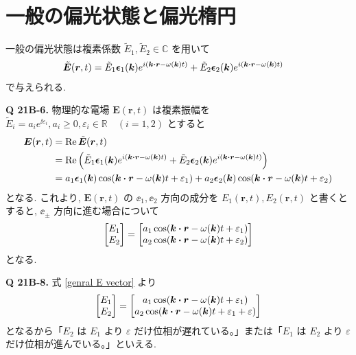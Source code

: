 \documentclass[uplatex,dvipdfmx,a4paper,11pt]{jlreq}
\newcommand{\CC}{\mathbb{C}}
\newcommand{\RR}{\mathbb{R}}
\newcommand{\EE}{\bm{E}}
\newcommand{\rr}{\bm{r}}
\newcommand{\kk}{\bm{k}}
\theoremstyle{definition}
\begin{document}
\section{一般の偏光状態と偏光楕円}
一般の偏光状態は複素係数 $\tilde{E}_1, \tilde{E}_2\in\CC$ を用いて
\begin{align}
  \tilde{\EE}(\rr, t) & = \tilde{E}_1\ee_1(\kk)e^{\ii(\kk\vdot\rr - \omega(\kk)t)} + \tilde{E}_2\ee_2(\kk)e^{\ii(\kk\vdot\rr - \omega(\kk)t)} \label{tilde E def}
\end{align}
で与えられる.

\textbf{Q 21B-6.} 物理的な電場 $\EE(\rr, t)$ は複素振幅を $\tilde{E}_i = a_ie^{\ii\varepsilon_i}, a_i \geq 0, \varepsilon_i\in\RR \quad (i = 1, 2)$ とすると
\begin{align}
  \EE(\rr, t) & = \Re\tilde{\EE}(\rr, t)                                                                                                                      \\
              & = \Re\qty(\tilde{E}_1\ee_1(\kk)e^{\ii(\kk\vdot\rr - \omega(\kk)t)} + \tilde{E}_2\ee_2(\kk)e^{\ii(\kk\vdot\rr - \omega(\kk)t)})                \\
              & = a_1\ee_1(\kk)\cos(\kk\vdot\rr - \omega(\kk)t + \varepsilon_1) + a_2\ee_2(\kk)\cos(\kk\vdot\rr - \omega(\kk)t + \varepsilon_2) \label{E def}
\end{align}
となる. これより, $\EE(\rr, t)$ の $\ee_1, \ee_2$ 方向の成分を $E_1(\rr, t), E_2(\rr, t)$ と書くとすると, $\ee_\pm$ 方向に進む場合について
\begin{align}
  \mqty[E_1 \\ E_2] = \mqty[a_1\cos(\kk\vdot\rr - \omega(\kk)t + \varepsilon_1) \\ a_2\cos(\kk\vdot\rr - \omega(\kk)t + \varepsilon_2)] \label{genral E vector}
\end{align}
となる.

\textbf{Q 21B-8.} 式 \eqref{genral E vector} より
\begin{align}
  \mqty[E_1 \\ E_2] = \mqty[a_1\cos(\kk\vdot\rr - \omega(\kk)t + \varepsilon_1) \\ a_2\cos(\kk\vdot\rr - \omega(\kk)t + \varepsilon_1 + \varepsilon)] \label{E12 phase}
\end{align}
となるから「$E_2$ は $E_1$ より $\varepsilon$ だけ位相が遅れている。」または「$E_1$ は $E_2$ より $\varepsilon$ だけ位相が進んでいる。」といえる. \\
\end{document}
